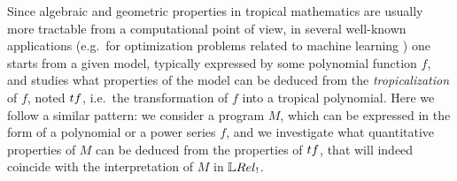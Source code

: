 
Since algebraic and geometric properties in tropical mathematics are usually more tractable from a computational point of view, in several well-known applications (e.g.~for optimization problems related to machine learning \cite{Pachter2004, Zhang2018, Maragos2021}) one starts from a given model, typically expressed by some polynomial function $f$, and studies 
what properties of the model can be deduced from the \emph{tropicalization} of $f$, noted $\trop f$, i.e.~the transformation of $f$ into a tropical polynomial.
%
%
%
Here we follow a similar pattern: we consider a program $M$, which can be expressed in the form of a polynomial or a power series $f$, and we 
investigate what quantitative properties of $M$ can be deduced from the properties of $\trop f$, that will indeed coincide with the interpretation of $M$ in $\LREL_{!}$.




